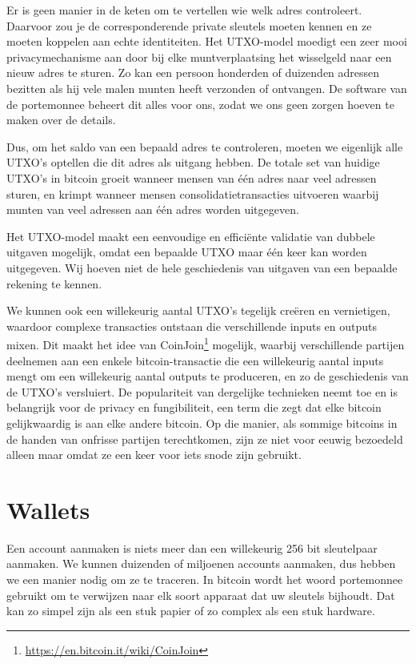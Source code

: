 Er is geen manier in de keten om te vertellen wie welk adres controleert. Daarvoor zou je de corresponderende private sleutels moeten kennen en ze moeten koppelen aan echte identiteiten. Het UTXO-model moedigt een zeer mooi privacymechanisme aan door bij elke muntverplaatsing het wisselgeld naar een nieuw adres te sturen. Zo kan een persoon honderden of duizenden adressen bezitten als hij vele malen munten heeft verzonden of ontvangen. De software van de portemonnee beheert dit alles voor ons, zodat we ons geen zorgen hoeven te maken over de details.

Dus, om het saldo van een bepaald adres te controleren, moeten we eigenlijk alle UTXO's optellen die dit adres als uitgang hebben. De totale set van huidige UTXO's in bitcoin groeit wanneer mensen van één adres naar veel adressen sturen, en krimpt wanneer mensen consolidatietransacties uitvoeren waarbij munten van veel adressen aan één adres worden uitgegeven.

Het UTXO-model maakt een eenvoudige en efficiënte validatie van dubbele uitgaven mogelijk, omdat een bepaalde UTXO maar één keer kan worden uitgegeven. Wij hoeven niet de hele geschiedenis van uitgaven van een bepaalde rekening te kennen.

We kunnen ook een willekeurig aantal UTXO's tegelijk creëren en vernietigen, waardoor complexe transacties ontstaan die verschillende inputs en outputs mixen. Dit maakt het idee van CoinJoin\footnote{\href{https://en.bitcoin.it/wiki/CoinJoin}{https://en.bitcoin.it/wiki/CoinJoin}} mogelijk, waarbij verschillende partijen deelnemen aan een enkele bitcoin-transactie die een willekeurig aantal inputs mengt om een willekeurig aantal outputs te produceren, en zo de geschiedenis van de UTXO's versluiert. De populariteit van dergelijke technieken neemt toe en is belangrijk voor de privacy en fungibiliteit, een term die zegt dat elke bitcoin gelijkwaardig is aan elke andere bitcoin. Op die manier, als sommige bitcoins in de handen van onfrisse partijen terechtkomen, zijn ze niet voor eeuwig bezoedeld alleen maar omdat ze een keer voor iets snode zijn gebruikt.

\section{Wallets}

Een account aanmaken is niets meer dan een willekeurig 256 bit sleutelpaar aanmaken. We kunnen duizenden of miljoenen accounts aanmaken, dus hebben we een manier nodig om ze te traceren. In bitcoin wordt het woord portemonnee gebruikt om te verwijzen naar elk soort apparaat dat uw sleutels bijhoudt. Dat kan zo simpel zijn als een stuk papier of zo complex als een stuk hardware. 

